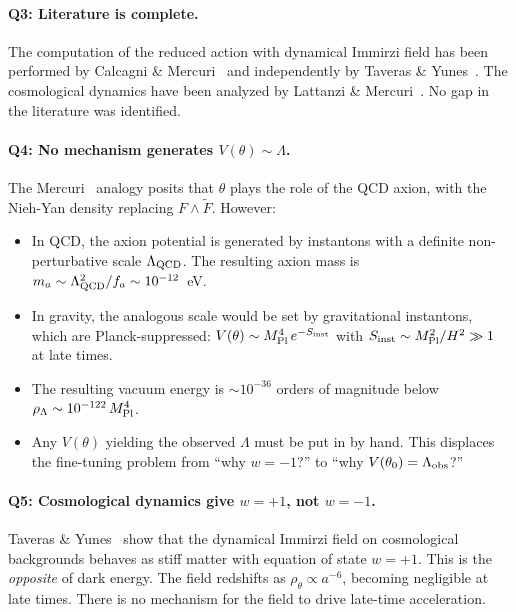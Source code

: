 \documentclass[11pt,letterpaper]{article}
\newcommand{\MPl}{M_{\rm Pl}}
\begin{document}
\paragraph{Q3: Literature is complete.}
The computation of the reduced action with dynamical Immirzi field has
been performed by Calcagni \& Mercuri~\cite{CalcagniMercuri2009} and
independently by Taveras \& Yunes~\cite{TaverasYunes2008}. The
cosmological dynamics have been analyzed by
Lattanzi \& Mercuri~\cite{LattanziMercuri2010}. No gap in the literature
was identified.

\paragraph{Q4: No mechanism generates $V(\theta)\sim\Lambda$.}
The Mercuri~\cite{Mercuri2009} analogy posits that $\theta$ plays the role
of the QCD axion, with the Nieh-Yan density replacing $F\wedge\tilde{F}$.
However:
\begin{itemize}
  \item In QCD, the axion potential is generated by instantons with a
    definite non-perturbative scale $\Lambda_{\rm QCD}$. The resulting
    axion mass is $m_a\sim\Lambda_{\rm QCD}^2/f_a\sim 10^{-12}$~eV.
  \item In gravity, the analogous scale would be set by gravitational
    instantons, which are Planck-suppressed: $V(\theta)\sim\MPl^4\,
    e^{-S_{\rm inst}}$ with $S_{\rm inst}\sim\MPl^2/H^2\gg 1$ at
    late times.
  \item The resulting vacuum energy is ${\sim}10^{-36}$ orders of
    magnitude below $\rho_\Lambda\sim 10^{-122}\,\MPl^4$.
  \item Any $V(\theta)$ yielding the observed $\Lambda$ must be put in
    by hand. This displaces the fine-tuning problem from ``why $w=-1$?''
    to ``why $V(\theta_0)=\Lambda_{\rm obs}$?''
\end{itemize}

\paragraph{Q5: Cosmological dynamics give $w=+1$, not $w=-1$.}
Taveras \& Yunes~\cite{TaverasYunes2008} show that the dynamical Immirzi
field on cosmological backgrounds behaves as stiff matter with equation of
state $w=+1$. This is the \emph{opposite} of dark energy. The field
redshifts as $\rho_\theta\propto a^{-6}$, becoming negligible at late
times. There is no mechanism for the field to drive late-time acceleration.
\end{document}
